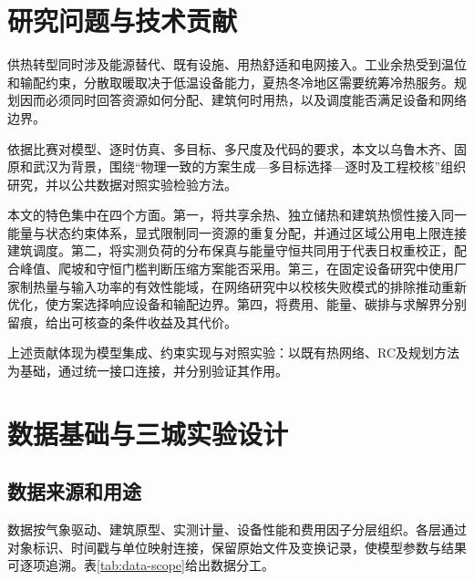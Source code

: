 \section{研究问题与技术贡献}

供热转型同时涉及能源替代、既有设施、用热舒适和电网接入。工业余热受到温位和输配约束，分散取暖取决于低温设备能力，夏热冬冷地区需要统筹冷热服务。规划因而必须同时回答资源如何分配、建筑何时用热，以及调度能否满足设备和网络边界。

依据比赛对模型、逐时仿真、多目标、多尺度及代码的要求，本文以乌鲁木齐、固原和武汉为背景，围绕“物理一致的方案生成—多目标选择—逐时及工程校核”组织研究，并以公共数据对照实验检验方法。

本文的特色集中在四个方面。第一，将共享余热、独立储热和建筑热惯性接入同一能量与状态约束体系，显式限制同一资源的重复分配，并通过区域公用电上限连接建筑调度。第二，将实测负荷的分布保真与能量守恒共同用于代表日权重校正，配合峰值、爬坡和守恒门槛判断压缩方案能否采用。第三，在固定设备研究中使用厂家制热量与输入功率的有效性能域，在网络研究中以校核失败模式的排除推动重新优化，使方案选择响应设备和输配边界。第四，将费用、能量、碳排与求解界分别留痕，给出可核查的条件收益及其代价。

上述贡献体现为模型集成、约束实现与对照实验：以既有热网络、RC及规划方法为基础，通过统一接口连接，并分别验证其作用。

\section{数据基础与三城实验设计}
\subsection{数据来源和用途}

数据按气象驱动、建筑原型、实测计量、设备性能和费用因子分层组织。各层通过对象标识、时间戳与单位映射连接，保留原始文件及变换记录，使模型参数与结果可逐项追溯。表\ref{tab:data-scope}给出数据分工。


